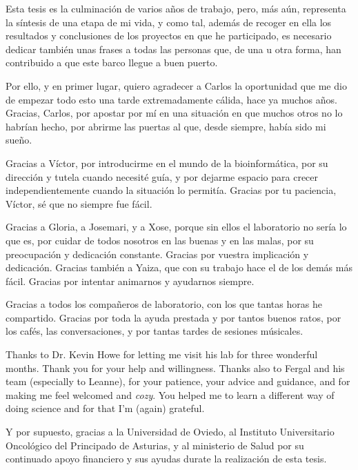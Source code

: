 \begin{itshape}
\small

    Esta tesis es la culminación de varios años de trabajo, pero, más aún, representa la síntesis de una etapa de mi vida, y como tal, además de recoger en ella los resultados y conclusiones de los proyectos en que he participado, es necesario dedicar también unas frases a todas las personas que, de una u otra forma, han contribuido a que este barco llegue a buen puerto.

    Por ello, y en primer lugar, quiero agradecer a Carlos la oportunidad que me dio de empezar todo esto una tarde extremadamente cálida, hace ya muchos años. Gracias, Carlos, por apostar por mí en una situación en que muchos otros no lo habrían hecho, por abrirme las puertas al que, desde siempre, había sido mi sueño.
    
    Gracias a Víctor, por introducirme en el mundo de la bioinformática, por su dirección y tutela cuando necesité guía, y por dejarme espacio para crecer independientemente cuando la situación lo permitía. Gracias por tu paciencia, Víctor, sé que no siempre fue fácil.
    
    Gracias a Gloria, a Josemari, y a Xose, porque sin ellos el laboratorio no sería lo que es, por cuidar de todos nosotros en las buenas y en las malas, por su preocupación y dedicación constante. Gracias por vuestra implicación y dedicación. Gracias también a Yaiza, que con su trabajo hace el de los demás más fácil. Gracias por intentar animarnos y ayudarnos siempre.
    
    Gracias a todos los compañeros de laboratorio, con los que tantas horas he compartido. Gracias por toda la ayuda prestada y por tantos buenos ratos, por los cafés, las conversaciones, y por tantas tardes de sesiones músicales.
    
    Thanks to Dr. Kevin Howe for letting me visit his lab for three wonderful months. Thank you for your help and willingness. Thanks also to Fergal and his team (especially to Leanne), for your patience, your advice and guidance, and for making me feel welcomed and \emph{cozy}. You helped me to learn a different way of doing science and for that I'm (again) grateful.
    
    Y por supuesto, gracias a la Universidad de Oviedo, al Instituto Universitario Oncológico del Principado de Asturias, y al ministerio de Salud por su continuado apoyo financiero y sus ayudas durate la realización de esta tesis.


\end{itshape}
